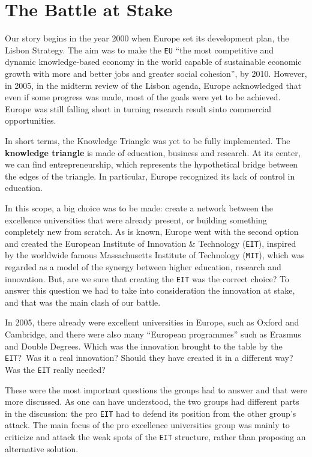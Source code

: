 \documentclass[11pt,a4paper,oneside,twocolumn]{IEEEtran}
\begin{document}
\section{The Battle at Stake}
Our story begins in the year 2000 when Europe set its development plan, the Lisbon Strategy. The aim was to make the \texttt{EU} ``the most competitive and dynamic knowledge-based economy in the world capable of sustainable economic growth with more and better jobs and greater social cohesion''\cite{2_1}, by 2010. However, in 2005, in the midterm review of the Lisbon agenda, Europe acknowledged that even if some progress was made, most of the goals were yet to be achieved. Europe was still falling short in turning research result sinto commercial opportunities.

In short terms, the Knowledge Triangle was yet to be fully implemented. The \textbf{knowledge triangle} is made of education, business and research. At its center, we can find entrepreneurship, which represents the hypothetical bridge between the edges of the triangle. In particular, Europe recognized its lack of control in education.

In this scope, a big choice was to be made: create a network between the excellence universities that were already present, or building something completely new from scratch. As is known, Europe went with the second option and created the European Institute of Innovation \& Technology (\texttt{EIT}), inspired by the worldwide famous Massachusetts Institute of Technology (\texttt{MIT}), which was regarded as a model of the synergy between higher education, research and innovation. But, are we sure that creating the \texttt{EIT} was the correct choice? To answer this question we had to take into consideration the innovation at stake, and that was the main clash of our battle.

In 2005, there already were excellent universities in Europe, such as Oxford and Cambridge, and there were also many ``European programmes'' such as Erasmus and Double Degrees.
Which was the innovation brought to the table by the \texttt{EIT}?\ Was it a real innovation? Should they have created it in a different way? Was the \texttt{EIT} really needed?

These were the most important questions the groups had to answer and that were more discussed. As one can have understood, the two groups had different parts in the discussion: the pro \texttt{EIT} had to defend its position from the other group's attack. The main focus of the pro excellence universities group was mainly to criticize and attack the weak spots of the \texttt{EIT} structure, rather than proposing an alternative solution.
\end{document}
